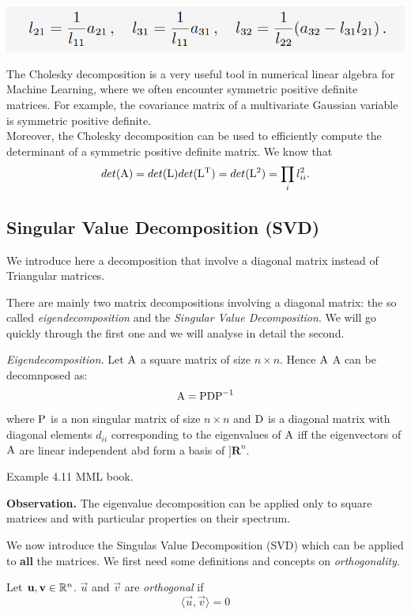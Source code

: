 \includegraphics[width=0.8 \textwidth]{sections/images/chol3.png}

The Cholesky decomposition is a very useful tool in numerical linear algebra for Machine Learning, where we often encounter symmetric positive definite matrices. For example, the covariance matrix of a multivariate Gaussian variable
is symmetric positive definite. \\
Moreover, the Cholesky decomposition can be used to efficiently compute the determinant of a symmetric positive definite matrix. We know that $$det(\mathrm{A})=det(\mathrm{L}) det(\mathrm{L^T})=det(\mathrm{L}^2)=\prod_i l_{ii}^2.$$

\subsection{Singular Value Decomposition (SVD)}

We introduce here a decomposition that involve a diagonal matrix instead of Triangular matrices.

There are mainly two matrix decompositions involving a diagonal matrix: the so called \textit{eigendecomposition} and the \textit{Singular Value Decomposition}.
We will go quickly through the first one and we will analyse in detail the second.

\begin{proposition}
\textit{Eigendecomposition.} Let $\mathrm{A}$ a square matrix of size $n \times n$. Hence $\mathrm{A}$ A can be decomnposed as:
$$\mathrm{A}=\mathrm{PDP}^{-1}$$
where $\mathrm{P}$ is a non singular matrix of size $n \times n$ and $\mathrm{D}$ is a diagonal matrix with diagonal elements $d_{ii}$ corresponding to the eigenvalues of $\mathrm{A}$ iff the eigenvectors of $\mathrm{A}$ are linear independent abd form a basis of $]\mathbf{R}^n$.
\end{proposition}

Example 4.11 MML book.

\textbf{Observation.} The eigenvalue decomposition can be applied only to square matrices and with particular properties on their spectrum.

We now introduce the Singulas Value Decomposition (SVD) which can be applied to \textbf{all} the matrices.
We first need some definitions and concepts on \textit{orthogonality}. 

\begin{definition}
    Let $\mathbf{u}, \mathbf{v} \in \mathbb{R}^n$. $\vec{u}$ and $\vec{v}$ are \textit{orthogonal} if
    $$ \langle\vec{u}, \vec{v}\rangle = 0 $$
\end{definition}

